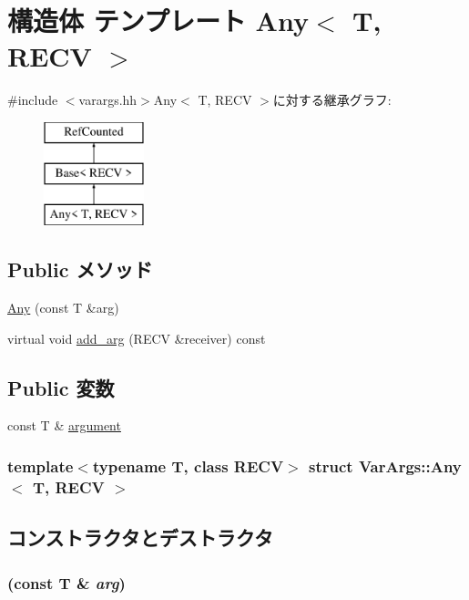 \hypertarget{structVarArgs_1_1Any}{
\section{構造体 テンプレート Any$<$ T, RECV $>$}
\label{structVarArgs_1_1Any}
}


{\ttfamily \#include $<$varargs.hh$>$}Any$<$ T, RECV $>$に対する継承グラフ:\begin{figure}[H]
\begin{center}
\leavevmode
\includegraphics[height=3cm]{structVarArgs_1_1Any}
\end{center}
\end{figure}
\subsection*{Public メソッド}
\begin{DoxyCompactItemize}
\item 
\hyperlink{structVarArgs_1_1Any_acea1ee772a023641fa06878543094e6d}{Any} (const T \&arg)
\item 
virtual void \hyperlink{structVarArgs_1_1Any_ab9c3a36cee779f61ec3d8d4d3db17f87}{add\_\-arg} (RECV \&receiver) const 
\end{DoxyCompactItemize}
\subsection*{Public 変数}
\begin{DoxyCompactItemize}
\item 
const T \& \hyperlink{structVarArgs_1_1Any_a1d0f3ec673f49f5eb4a58d64ae70fb5e}{argument}
\end{DoxyCompactItemize}
\subsubsection*{template$<$typename T, class RECV$>$ struct VarArgs::Any$<$ T, RECV $>$}



\subsection{コンストラクタとデストラクタ}
\hypertarget{structVarArgs_1_1Any_acea1ee772a023641fa06878543094e6d}{
\subsubsection[{Any}]{ (const T \& {\em arg})}}
\label{structVarArgs_1_1Any_acea1ee772a023641fa06878543094e6d}



